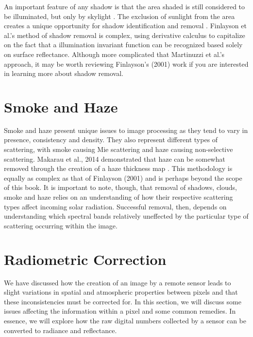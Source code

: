 \documentclass[
]{book}
\begin{document}
An important feature of any shadow is that the area shaded is still
considered to be illuminated, but only by skylight . The exclusion of
sunlight from the area creates a unique opportunity for shadow
identification and removal \citep{finlayson2001}. Finlayson et al.'s method
of shadow removal is complex, using derivative calculus to capitalize on
the fact that a illumination invariant function can be recognized based
solely on surface reflectance. Although more complicated that Martinuzzi
et al.'s approach, it may be worth reviewing Finlayson's (2001) work if
you are interested in learning more about shadow removal.

\hypertarget{smoke-and-haze}{%
\section{Smoke and Haze}\label{smoke-and-haze}}

Smoke and haze present unique issues to image processing as they tend to
vary in presence, consistency and density. They also represent different
types of scattering, with smoke causing Mie scattering and haze causing
non-selective scattering. Makarau et al., 2014 demonstrated that haze
can be somewhat removed through the creation of a haze thickness map
\citep{makarau2014}. This methodology is equally as complex as that of
Finlayson (2001) and is perhaps beyond the scope of this book. It is
important to note, though, that removal of shadows, clouds, smoke and
haze relies on an understanding of how their respective scattering types
affect incoming solar radiation. Successful removal, then, depends on
understanding which spectral bands relatively uneffected by the
particular type of scattering occurring within the image.

\hypertarget{radiometric-correction}{%
\section{Radiometric Correction}\label{radiometric-correction}}

We have discussed how the creation of an image by a remote sensor leads
to slight variations in spatial and atmospheric properties between
pixels and that these inconsistencies must be corrected for. In this
section, we will discuss some issues affecting the information within a
pixel and some common remedies. In essence, we will explore how the raw
digital numbers collected by a sensor can be converted to radiance and
reflectance.
\end{document}
